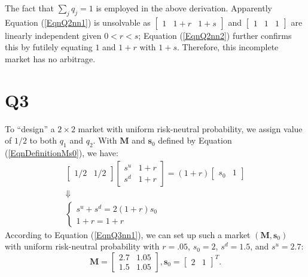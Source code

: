 \documentclass[final,3p,times]{elsarticle}
\begin{document}
	The fact that $\sum_{j} q_j = 1$ is employed in the above derivation. Apparently Equation (\ref{EqnQ2nn1}) is unsolvable as $\begin{bmatrix} 1 & 1+r & 1+s \end{bmatrix}$ and $\begin{bmatrix} 1 & 1 & 1 \end{bmatrix}$ are linearly independent given $0<r<s$; Equation (\ref{EqnQ2nn2}) further confirms this by futilely equating $1$ and $1+r$ with $1+s$. Therefore, this incomplete market has no arbitrage.
	
\section{Q3}
	To ``design'' a $2\times2$ market with uniform risk-neutral probability, we assign value of $1/2$ to both $q_1$ and $q_2$. With $\mathbf{M}$ and $\mathbf{s}_0$ defined by Equation (\ref{EqnDefinitionMs0}), we have:
	\begin{gather}
		\begin{bmatrix} 1/2 & 1/2 \end{bmatrix}
		\begin{bmatrix} s^u & 1+r \\ s^d & 1+r \end{bmatrix}
		=
		\left( 1+r \right)\begin{bmatrix} s_0 & 1 \end{bmatrix}\\
		\Downarrow\nonumber\\
		\label{EqnQ3nn1}
		\begin{cases}
			s^u + s^d = 2\left(1+r\right) s_0 \\
			1+r = 1+r
		\end{cases}
	\end{gather}
	According to Equation (\ref{EqnQ3nn1}), we can set up such a market $\left(\mathbf{M},\mathbf{s}_0\right)$ with uniform risk-neutral probability with $r=.05$, $s_0=2$, $s^d=1.5$, and $s^u=2.7$:
	\begin{subequations}
		\label{EqnQ3soln}
		\begin{equation}
		\mathbf{M}=
		\begin{bmatrix}
		2.7 & 1.05 \\
		1.5 & 1.05
		\end{bmatrix}
		,
		\end{equation}
		\begin{equation}
		\mathbf{s}_0=
		\begin{bmatrix}
		2 & 1
		\end{bmatrix}^T
		.
		\end{equation}
	\end{subequations}
	
\end{document}
